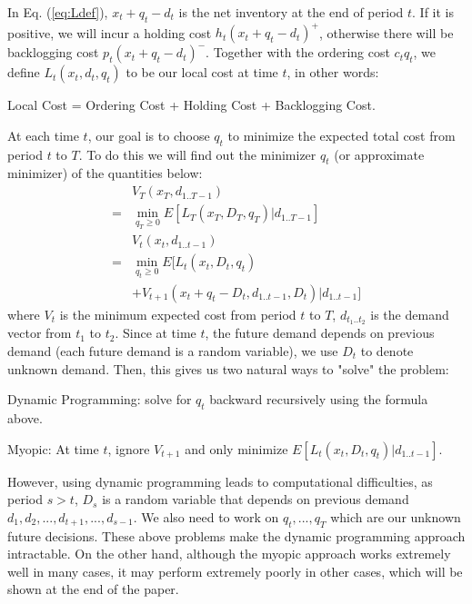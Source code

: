 \documentclass[twoside]{article}
\begin{document}
\begin{multicols}{2}
    In Eq. (\ref{eq:Ldef}), $x_t + q_t - d_t$ is the net inventory at the end of period $t$. If it is positive, we will incur a holding cost $h_t(x_t + q_t - d_t)^{+}$, otherwise there will be backlogging cost $p_t(x_t + q_t - d_t)^{-}$. Together with the ordering cost $c_tq_t$, we define $L_t(x_t,d_t,q_t)$ to be our local cost at time $t$, in other words:
    \begin{center}\small Local Cost = Ordering Cost + Holding Cost + Backlogging Cost. \normalsize \end{center}
    At each time $t$, our goal is to choose $q_t$ to minimize the expected total cost from period $t$ to $T$. To do this we will find out the minimizer $q_t$ (or approximate minimizer) of the quantities below:
    \begin{equation}\label{eq:Vt}
    \begin{array}{rl}
    & V_T(x_T,d_{1..T-1}) \\
    = & \min_{q_T \geq 0} E[L_T(x_T,D_T,q_T) | d_{1..T-1}]\\
    &V_t(x_t,d_{1..t-1}) \\
    = & \min_{q_t \geq 0} E[L_t(x_t,D_t,q_t)\\
    & +V_{t+1}(x_t + q_t - D_t, d_{1..t-1},D_t)|d_{1..t-1}]
    \end{array}
    \end{equation}
    where $V_t$ is the minimum expected cost from period $t$ to $T$, $d_{t_1..t_2}$ is the demand vector from $t_1$ to $t_2$. Since at time $t$, the future demand depends on previous demand (each future demand is a random variable), we use $D_t$ to denote unknown demand. Then, this gives us two natural ways to "solve" the problem:
    \begin{compactitem}
      \item
        Dynamic Programming: solve for $q_t$ backward recursively using the formula above.
      \item
        Myopic: At time $t$, ignore $V_{t+1}$ and only minimize $E[L_t(x_t,D_t,q_t)|d_{1..t-1}]$.
    \end{compactitem}
     However, using dynamic programming leads to computational difficulties, as period $s>t$, $D_s$ is a random variable that depends on previous demand $d_1, d_2,...,d_{t+1},...,d_{s-1}$. We also need to work on $q_t,...,q_T$ which are our unknown future decisions. These above problems make the dynamic programming approach intractable. On the other hand, although the myopic approach works extremely well in many cases\cite{CLAcha1}, it may perform extremely poorly in other cases, which will be shown at the end of the paper.\\


\end{multicols}
\end{document}
